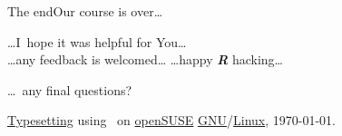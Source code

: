 \documentclass[compress, xelatex, 11pt, xcolor=svgnames, aspectratio=169, url={hyphens, lowtilde}]{beamer}
\begin{document}
\begin{frame}{The end}{Our course is over\ldots}
	\begin{center}
		\ldots I~hope it was helpful for You\ldots\\
		\vfill
		\ldots any feedback is welcomed\ldots
		\vfill
		\ldots happy \textbf{\textit{R}} hacking\ldots
		\vfill
	\end{center}
	\begin{flushright}
		\ldots~any final questions?
		\vfill
		\begin{tiny}
		\href{https://en.wikipedia.org/wiki/XeTeX}{Typesetting} using \XeLaTeX~on \href{https://www.opensuse.org/}{openSUSE} \href{https://en.wikipedia.org/wiki/GNU}{GNU}/\href{https://en.wikipedia.org/wiki/Linux}{Linux}, \today.
		\end{tiny}
	\end{flushright}
\end{frame}
\end{document}

